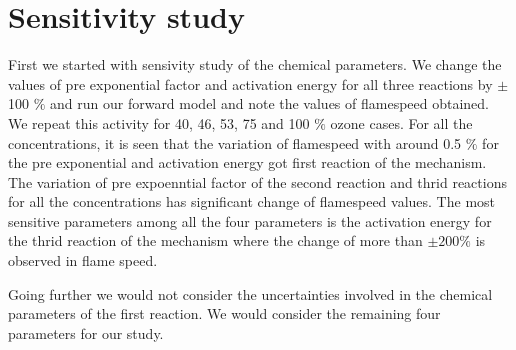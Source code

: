 \section{Sensitivity study}

\noindent First we started with sensivity study of the chemical parameters. We change the values of pre exponential factor and activation energy for all three reactions by $\pm$ 100 $\% $ and run our forward model and note the values of flamespeed obtained. We repeat this activity for 40, 46, 53, 75 and 100 $\%$ ozone cases. For all the concentrations, it is seen that the variation of flamespeed with around 0.5 $\%$ for the pre exponential and activation energy got first reaction of the mechanism. The variation of pre expoenntial factor of the second reaction and thrid reactions for all the concentrations has significant change of flamespeed values. The most sensitive parameters among all the four parameters is the activation energy for the thrid reaction of the mechanism where the change of more than $\pm 200\%$ is observed in flame speed. 

\noindent Going further we would not consider the uncertainties involved in the chemical parameters of the first reaction. We would consider the remaining four parameters for our study.  